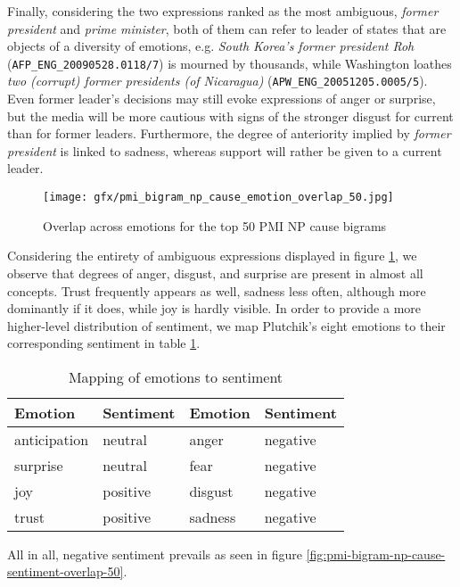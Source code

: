 Finally, considering the two expressions ranked as the most ambiguous, \textit{former president} and \textit{prime minister}, both of them can refer to leader of states that are objects of a diversity of emotions, e.g. \textit{South Korea's former president Roh} (\texttt{AFP\_ENG\_20090528.0118/7}) is mourned by thousands, while Washington loathes \textit{two (corrupt) former presidents (of Nicaragua)} (\texttt{APW\_ENG\_20051205.0005/5}). Even former leader's decisions may still evoke expressions of anger or surprise, but the media will be more cautious with signs of the stronger disgust for current than for former leaders. Furthermore, the degree of anteriority implied by \textit{former president} is linked to sadness, whereas support will rather be given to a current leader.

\begin{figure}[bth]
\texttt{[image: gfx/pmi\_bigram\_np\_cause\_emotion\_overlap\_50.jpg]}
\caption{Overlap across emotions for the top 50 PMI NP cause bigrams}\label{fig:pmi-bigram-np-cause-emotion-overlap-50}
\end{figure}

Considering the entirety of ambiguous expressions displayed in figure \ref{fig:pmi-bigram-np-cause-emotion-overlap-50}, we observe that degrees of anger, disgust, and surprise are present in almost all concepts. Trust frequently appears as well, sadness less often, although more dominantly if it does, while joy is hardly visible. In order to provide a more higher-level distribution of sentiment, we map Plutchik's eight emotions to their corresponding sentiment in table \ref{tab:emotion2sentiment}.

\begin{table}[]
\centering
\begin{tabular}{l|l||l|l}
{\bf Emotion} & {\bf Sentiment} & {\bf Emotion} & {\bf Sentiment} \\\hline
anticipation  & neutral & anger & negative        \\
surprise      & neutral & fear  & negative        \\
joy           & positive & disgust & negative        \\
trust         & positive & sadness & negative       
\end{tabular}
\caption{Mapping of emotions to sentiment}
\label{tab:emotion2sentiment}
\end{table}

All in all, negative sentiment prevails as seen in figure \ref{fig:pmi-bigram-np-cause-sentiment-overlap-50}.


